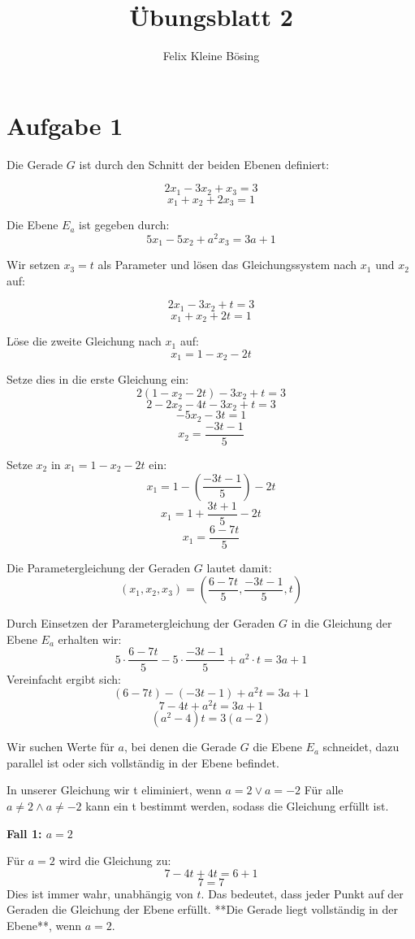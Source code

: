 \documentclass[11pt]{article}
\begin{document}
\title{Übungsblatt 2}
\author{Felix Kleine Bösing}
\maketitle

\section*{Aufgabe 1}
Die Gerade \( G \) ist durch den Schnitt der beiden Ebenen definiert:

\[
2x_1 - 3x_2 + x_3 = 3
\]
\[
x_1 + x_2 + 2x_3 = 1
\]

Die Ebene \( E_a \) ist gegeben durch:
\[
5x_1 - 5x_2 + a^2 x_3 = 3a + 1
\]

Wir setzen \( x_3 = t \) als Parameter und lösen das Gleichungssystem nach \( x_1 \) und \( x_2 \) auf:

\[
2x_1 - 3x_2 + t = 3
\]
\[
x_1 + x_2 + 2t = 1
\]

Löse die zweite Gleichung nach \( x_1 \) auf:
\[
x_1 = 1 - x_2 - 2t
\]

Setze dies in die erste Gleichung ein:
\[
2(1 - x_2 - 2t) - 3x_2 + t = 3
\]
\[
2 - 2x_2 - 4t - 3x_2 + t = 3
\]
\[
-5x_2 - 3t = 1
\]
\[
x_2 = \frac{-3t - 1}{5}
\]

Setze \( x_2 \) in \( x_1 = 1 - x_2 - 2t \) ein:
\[
x_1 = 1 - \left(\frac{-3t - 1}{5}\right) - 2t
\]
\[
x_1 = 1 + \frac{3t + 1}{5} - 2t
\]
\[
x_1 = \frac{6 - 7t}{5}
\]

Die Parametergleichung der Geraden \( G \) lautet damit:
\[
(x_1, x_2, x_3) = \left( \frac{6 - 7t}{5}, \frac{-3t - 1}{5}, t \right)
\]

Durch Einsetzen der Parametergleichung der Geraden \( G \) in die Gleichung der Ebene \( E_a \) erhalten wir:
\[
5 \cdot \frac{6 - 7t}{5} - 5 \cdot \frac{-3t - 1}{5} + a^2 \cdot t = 3a + 1
\]
Vereinfacht ergibt sich:
\[
(6 - 7t) - (-3t - 1) + a^2 t = 3a + 1
\]
\[
7 - 4t + a^2 t = 3a + 1
\]
\[
(a^2-4) t = 3(a - 2)
\]

Wir suchen Werte für \( a \), bei denen die Gerade \( G \) die Ebene \( E_a \) schneidet, dazu parallel ist oder sich vollständig in der Ebene befindet.

In unserer Gleichung wir t eliminiert, wenn \(a = 2 \lor a = -2\)
Für alle \(a \neq 2 \land a \neq -2\) kann ein t bestimmt werden, sodass die Gleichung erfüllt ist.

\textbf{Fall 1: \( a = 2 \)}

Für \( a = 2 \) wird die Gleichung zu:
\[
7 - 4t + 4t = 6 + 1
\]
\[
7 = 7
\]
Dies ist immer wahr, unabhängig von \( t \). Das bedeutet, dass jeder Punkt auf der Geraden die Gleichung der Ebene erfüllt. **Die Gerade liegt vollständig in der Ebene**, wenn \( a = 2 \).
\end{document}
